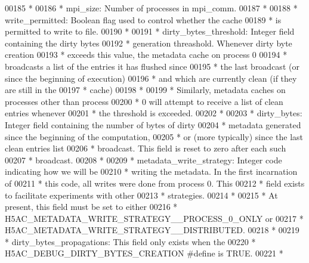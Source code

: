 \begin{DoxyCode}
00185 \textcolor{comment}{ *}
00186 \textcolor{comment}{ * mpi\_size:    Number of processes in mpi\_comm.}
00187 \textcolor{comment}{ *}
00188 \textcolor{comment}{ * write\_permitted:  Boolean flag used to control whether the cache}
00189 \textcolor{comment}{ *      is permitted to write to file.}
00190 \textcolor{comment}{ *}
00191 \textcolor{comment}{ * dirty\_bytes\_threshold: Integer field containing the dirty bytes}
00192 \textcolor{comment}{ *      generation threashold.  Whenever dirty byte creation}
00193 \textcolor{comment}{ *      exceeds this value, the metadata cache on process 0}
00194 \textcolor{comment}{ *      broadcasts a list of the entries it has flushed since}
00195 \textcolor{comment}{ *      the last broadcast (or since the beginning of execution)}
00196 \textcolor{comment}{ *      and which are currently clean (if they are still in the}
00197 \textcolor{comment}{ *      cache)}
00198 \textcolor{comment}{ *}
00199 \textcolor{comment}{ *      Similarly, metadata caches on processes other than process}
00200 \textcolor{comment}{ *      0 will attempt to receive a list of clean entries whenever}
00201 \textcolor{comment}{ *      the threshold is exceeded.}
00202 \textcolor{comment}{ *}
00203 \textcolor{comment}{ * dirty\_bytes:  Integer field containing the number of bytes of dirty}
00204 \textcolor{comment}{ *      metadata generated since the beginning of the computation,}
00205 \textcolor{comment}{ *      or (more typically) since the last clean entries list}
00206 \textcolor{comment}{ *      broadcast.  This field is reset to zero after each such}
00207 \textcolor{comment}{ *      broadcast.}
00208 \textcolor{comment}{ *}
00209 \textcolor{comment}{ * metadata\_write\_strategy: Integer code indicating how we will be }
00210 \textcolor{comment}{ *      writing the metadata.  In the first incarnation of }
00211 \textcolor{comment}{ *      this code, all writes were done from process 0.  This}
00212 \textcolor{comment}{ *      field exists to facilitate experiments with other }
00213 \textcolor{comment}{ *      strategies.}
00214 \textcolor{comment}{ *}
00215 \textcolor{comment}{ *      At present, this field must be set to either}
00216 \textcolor{comment}{ *      H5AC\_METADATA\_WRITE\_STRATEGY\_\_PROCESS\_0\_ONLY or }
00217 \textcolor{comment}{ *      H5AC\_METADATA\_WRITE\_STRATEGY\_\_DISTRIBUTED.}
00218 \textcolor{comment}{ *}
00219 \textcolor{comment}{ * dirty\_bytes\_propagations: This field only exists when the}
00220 \textcolor{comment}{ *      H5AC\_DEBUG\_DIRTY\_BYTES\_CREATION #define is TRUE.}
00221 \textcolor{comment}{ *}

\end{DoxyCode}

